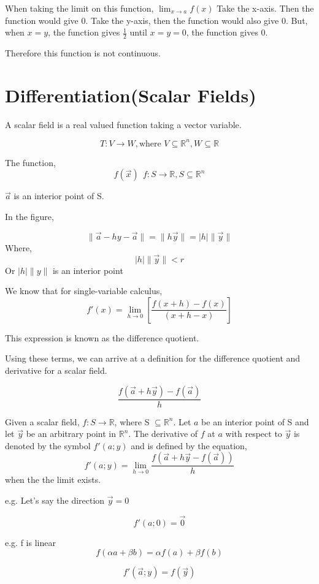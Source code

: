 \documentclass[twoside]{report}
\begin{document}
When taking the limit on this function, $\lim_{x \rightarrow a} f(x)$ Take the x-axis. Then the function would give 0. Take the y-axis, then the function would also give 0. But, when $x=y$, the function  gives $\frac{1}{2}$ until $x = y = 0$, the function gives 0. 

Therefore this function is not continuous.

\section{Differentiation(Scalar Fields)}
A scalar field is a real valued function taking a vector variable.

\[
   T : V \rightarrow W, \text{where } V \subseteq \mathbb{R}^{n}, W \subseteq \mathbb{R}
\]

The function, 
\[
   f(\vec{x}) \ \ f:S \rightarrow \mathbb{R}, S \subseteq \mathbb{R}^n
\]

$\vec{a}$ is an interior point of S.

In the figure, 

\[
   \| \vec{a} - hy - \vec{a} \| = \| h\vec{y} \| = |h|\|\vec{y}\|
\]
Where, 
\[
   |h|\|\vec{y}\| < r
\]
Or $|h|\|y\|$ is an interior point

We know that for single-variable calculus,
\[
   f'(x) = \lim_{h \rightarrow 0}[\frac{f(x+h) - f(x)}{(x+h-x)}]
\]

This expression is known as the difference quotient. 

Using these terms, we can arrive at a definition for the difference quotient and derivative for a scalar field. 

\[
   \frac{f(\vec{a}+h\vec{y}) - f(\vec{a})}{h}
\]
\begin{definition}[Derivative]
   Given a scalar field, $f:S \rightarrow \mathbb{R}$, where S $\subseteq \mathbb{R}^n$. Let $a$ be an interior point of S and let $\vec{y}$ be an arbitrary point in $\mathbb{R}^n$. The derivative of $f$ at $a$ with respect to $\vec{y}$ is denoted by the symbol $f'(a;y)$ and is defined by the equation,
   \[
      f'(a;y) = \lim_{h \rightarrow 0} \frac{f(\vec{a}+h\vec{y} - f(\vec{a}))}{h}
   \]
when the the limit exists.		
\end{definition}
e.g. Let's say the direction $\vec{y} = 0$

$$f'(a;0) = \vec{0}$$

e.g. f is linear
$$f(\alpha a + \beta b) = \alpha f(a) + \beta f(b)$$

$$f'(\vec{a};y) = f(\vec{y})$$
\end{document}
